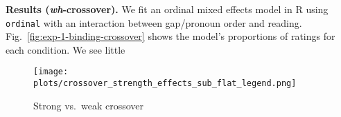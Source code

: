 \documentclass[12pt,letterpaper]{article}
\newcommand{\sectitle}[1]{\smallskip \textbf{#1.}}
\begin{document}




\sectitle{Results (\emph{wh}-crossover)} We fit an ordinal mixed effects model in R using \verb|ordinal| \citep{r_ordinal_2019}
with an interaction between gap/pronoun order and reading. %
Fig.~\ref{fig:exp-1-binding-crossover} shows the model's proportions of ratings for each condition. We see little 

\clearpage

\begin{wrapfigure}{r}{0.36\textwidth}
\centering
\texttt{[image: plots/crossover\_strength\_effects\_sub\_flat\_legend.png]}
\caption{Strong vs.~weak crossover}
\label{fig:exp-1-strength}
\end{wrapfigure}
\end{document}
